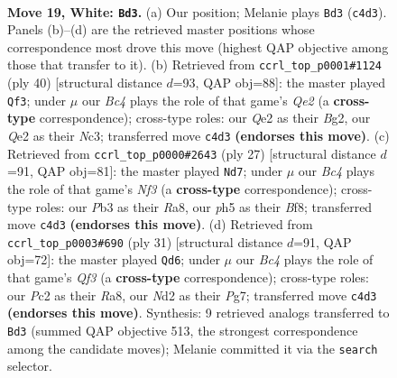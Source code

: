 \documentclass[11pt]{article}
\begin{document}
\begin{figure}[p]\centering
\begin{subfigure}{0.46\textwidth}\centering
\resizebox{\linewidth}{!}{%
\newchessgame
\chessboard[
  setfen={r1bqk2r/5p2/1p2pnp1/p1b4p/P1B2B1P/1P4P1/2PNQP2/R3R1K1 w q - 5 19},
  showmover=false,
  pgfstyle=straightmove, color=movearrow, markmove={c4-d3}
]}
\caption{}
\end{subfigure}\hfill
\begin{subfigure}{0.46\textwidth}\centering
\resizebox{\linewidth}{!}{%
\newchessgame
\chessboard[
  setfen={4r1k1/1pq1npp1/p2r1b1p/P2p4/2pP1P2/2N1P1P1/1P2Q1BP/R3R2K w - - 3 21},
  showmover=false,
  pgfstyle=straightmove, color=movearrow, markmove={e2-f3}
]}
\caption{}
\end{subfigure}
\\[4pt]
\begin{subfigure}{0.46\textwidth}\centering
\resizebox{\linewidth}{!}{%
\newchessgame
\chessboard[
  setfen={r2qkb1r/1p3ppp/2p1pnb1/p7/P1BPP3/2N2P2/1P4PP/R1BQK2R b KQkq - 0 14},
  showmover=false,
  pgfstyle=straightmove, color=movearrow, markmove={f6-d7}
]}
\caption{}
\end{subfigure}\hfill
\begin{subfigure}{0.46\textwidth}\centering
\resizebox{\linewidth}{!}{%
\newchessgame
\chessboard[
  setfen={r4rk1/ppp3pp/1bn2qb1/3p4/3P4/1QP1BN1P/P3BPP1/R3K2R b KQ - 3 16},
  showmover=false,
  pgfstyle=straightmove, color=movearrow, markmove={f6-d6}
]}
\caption{}
\end{subfigure}
\caption{\textbf{Move 19, White: \texttt{Bd3}.} (a) Our position; Melanie plays \texttt{Bd3} (\texttt{c4d3}). Panels (b)--(d) are the retrieved master positions whose correspondence most drove this move (highest QAP objective among those that transfer to it). (b) Retrieved from \texttt{ccrl\_top\_p0001\#1124} (ply 40) [structural distance $d$=93, QAP obj=88]: the master played \texttt{Qf3}; under $\mu$ our \emph{Bc4} plays the role of that game's \emph{Qe2} (a \textbf{cross-type} correspondence); cross-type roles: our \emph{Q}e2 as their \emph{B}g2, our \emph{Q}e2 as their \emph{N}c3; transferred move \texttt{c4d3} \textbf{(endorses this move)}. (c) Retrieved from \texttt{ccrl\_top\_p0000\#2643} (ply 27) [structural distance $d$=91, QAP obj=81]: the master played \texttt{Nd7}; under $\mu$ our \emph{Bc4} plays the role of that game's \emph{Nf3} (a \textbf{cross-type} correspondence); cross-type roles: our \emph{P}b3 as their \emph{R}a8, our \emph{p}h5 as their \emph{B}f8; transferred move \texttt{c4d3} \textbf{(endorses this move)}. (d) Retrieved from \texttt{ccrl\_top\_p0003\#690} (ply 31) [structural distance $d$=91, QAP obj=72]: the master played \texttt{Qd6}; under $\mu$ our \emph{Bc4} plays the role of that game's \emph{Qf3} (a \textbf{cross-type} correspondence); cross-type roles: our \emph{P}c2 as their \emph{R}a8, our \emph{N}d2 as their \emph{P}g7; transferred move \texttt{c4d3} \textbf{(endorses this move)}. Synthesis: 9 retrieved analogs transferred to \texttt{Bd3} (summed QAP objective 513, the strongest correspondence among the candidate moves); Melanie committed it via the \texttt{search} selector.}
\label{fig:thought-m36}
\end{figure}
\end{document}
